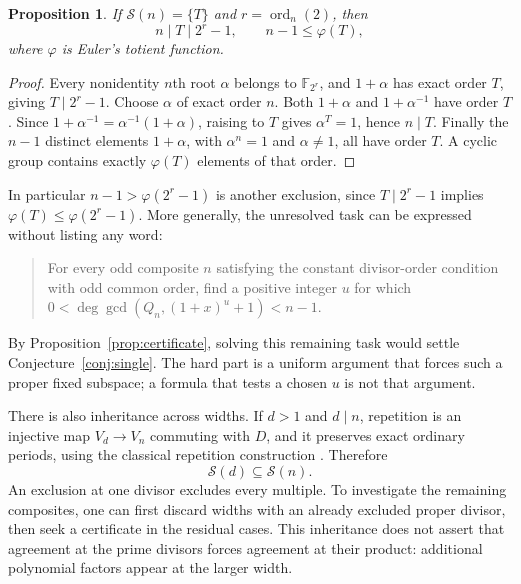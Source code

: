 \documentclass[11pt]{article}
\newtheorem{proposition}[theorem]{Proposition}
\theoremstyle{definition}
\theoremstyle{remark}
\numberwithin{equation}{section}
\newcommand{\Spec}{\mathcal S}
\DeclareMathOperator{\ord}{ord}
\begin{document}
\begin{proposition}\label{prop:capacity}
If $\Spec(n)=\{T\}$ and $r=\ord_n(2)$, then
\begin{equation}\label{eq:capacity}
 n\mid T\mid 2^r-1,\qquad n-1\le\varphi(T),
\end{equation}
where $\varphi$ is Euler's totient function.
\end{proposition}

\begin{proof}
Every nonidentity $n$th root $\alpha$ belongs to $\mathbb F_{2^r}$,
and $1+\alpha$ has exact order $T$, giving $T\mid2^r-1$.
Choose $\alpha$ of exact order $n$. Both $1+\alpha$ and
$1+\alpha^{-1}$ have order $T$. Since
$1+\alpha^{-1}=\alpha^{-1}(1+\alpha)$, raising to $T$ gives
$\alpha^T=1$, hence $n\mid T$. Finally the $n-1$ distinct elements
$1+\alpha$, with $\alpha^n=1$ and $\alpha\ne1$, all have order $T$.
A cyclic group contains exactly $\varphi(T)$ elements of that order.
\end{proof}

In particular $n-1>\varphi(2^r-1)$ is another exclusion, since
$T\mid2^r-1$ implies $\varphi(T)\le\varphi(2^r-1)$. More generally,
the unresolved task can be expressed without listing any word:
\begin{quote}
For every odd composite $n$ satisfying the constant divisor-order
condition with odd common order, find a positive integer $u$ for which
$0<\deg\gcd(Q_n,(1+x)^u+1)<n-1$.
\end{quote}
By Proposition~\ref{prop:certificate}, solving this remaining task would
settle Conjecture~\ref{conj:single}. The hard part is a uniform argument
that forces such a proper fixed subspace; a formula that tests a chosen
$u$ is not that argument.

There is also inheritance across widths. If $d>1$ and $d\mid n$, repetition is
an injective map $V_d\to V_n$ commuting with $D$, and it preserves exact
ordinary periods, using the classical repetition construction
\cite[Theorem~5 and its proof]{Ehrlich}. Therefore
\begin{equation}\label{eq:inheritance}
 \Spec(d)\subseteq\Spec(n).
\end{equation}
An exclusion at one divisor excludes every multiple. To investigate
the remaining composites, one can first discard widths with an already
excluded proper divisor, then seek a certificate in the residual cases.
This inheritance does not assert that agreement at the prime divisors
forces agreement at their product: additional polynomial factors appear
at the larger width.
\end{document}
